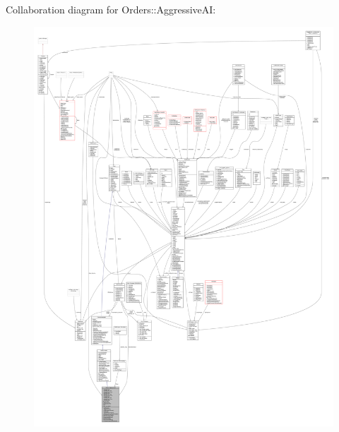 Collaboration diagram for Orders\+:\+:Aggressive\+AI\+:
\nopagebreak
\begin{figure}[H]
\begin{center}
\leavevmode
\includegraphics[width=350pt]{de/d50/classOrders_1_1AggressiveAI__coll__graph}
\end{center}
\end{figure}
